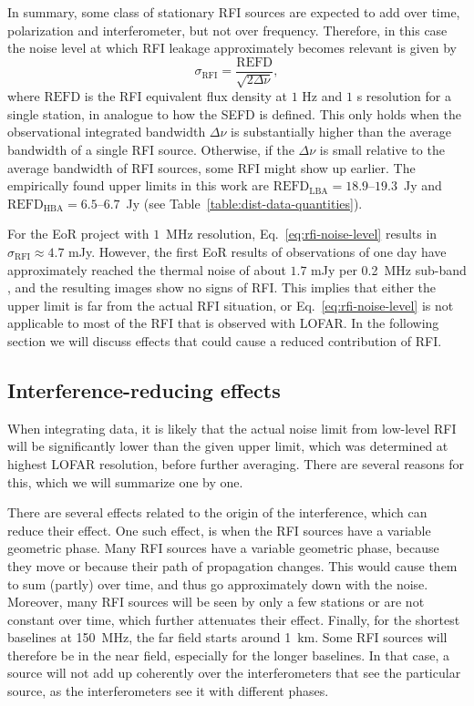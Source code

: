 \documentclass[useAMS,usenatbib]{mn2e}
\newcommand{\editmark}[1]{{\color{red}{\textbf{#1}}}}
\begin{document}
In summary, some class of stationary RFI sources are expected to add \editmark{consistently} over time, polarization and interferometer, but not over frequency. Therefore, in this case the noise level at which RFI leakage approximately becomes relevant is given by
\begin{equation} \label{eq:rfi-noise-level}
 \sigma_\textrm{RFI} = \frac{\textrm{REFD}}{\sqrt{2 \Delta \nu}},
\end{equation}
where $\textrm{REFD}$ is the RFI equivalent flux density at $1$ Hz and $1$ s resolution for a single station, in analogue to how the SEFD is defined. This only holds when the observational integrated bandwidth $\Delta \nu$ is substantially higher than the average bandwidth of a single RFI source. Otherwise, if the $\Delta \nu$ is small relative to the average bandwidth of RFI sources, some RFI might show up earlier. The empirically found upper limits in this work are $\textrm{REFD}_\textrm{LBA}=18.9$--$19.3$~Jy and $\textrm{REFD}_\textrm{HBA}=6.5$--$6.7$~Jy (see Table~\ref{table:dist-data-quantities}).

For the EoR project with $1$~MHz resolution, Eq.~\ref{eq:rfi-noise-level} results in $\sigma_\textrm{RFI}\approx 4.7$ mJy. However, the first EoR results of observations of one day have approximately reached the thermal noise of about $1.7$ mJy per 0.2~MHz sub-band \citep{ncp-eor-yatawatta}, and the resulting images show no signs of RFI. This implies that either the upper limit is far from the actual RFI situation, or Eq.~\ref{eq:rfi-noise-level} is not applicable to most of the RFI that is observed with LOFAR. In the following section we will discuss effects that could cause a reduced contribution of RFI.

\subsection{Interference-reducing effects} \label{sec:coherence-reduction}
When integrating data, it is likely that the actual noise limit from low-level RFI will be significantly lower than the given upper limit, which was determined at highest LOFAR resolution, before further averaging. There are several reasons for this, which we will summarize one by one.

There are several effects related to the origin of the interference, which can reduce their effect. One such effect, is when the RFI sources have a variable geometric phase. Many RFI sources have a variable geometric phase, because they move or because their path of propagation changes. This would cause them to sum (partly) \editmark{inconsistently} over time, and thus go approximately down with the noise. Moreover, many RFI sources will be seen by only a few stations or are not constant over time, which further attenuates their effect. Finally, for the shortest baselines at 150~MHz, the far field starts around 1~km. Some RFI sources will therefore be in the near field, especially for the longer baselines. In that case, a source will not add up coherently over the interferometers that see the particular source, as the interferometers see it with different phases.
\end{document}
